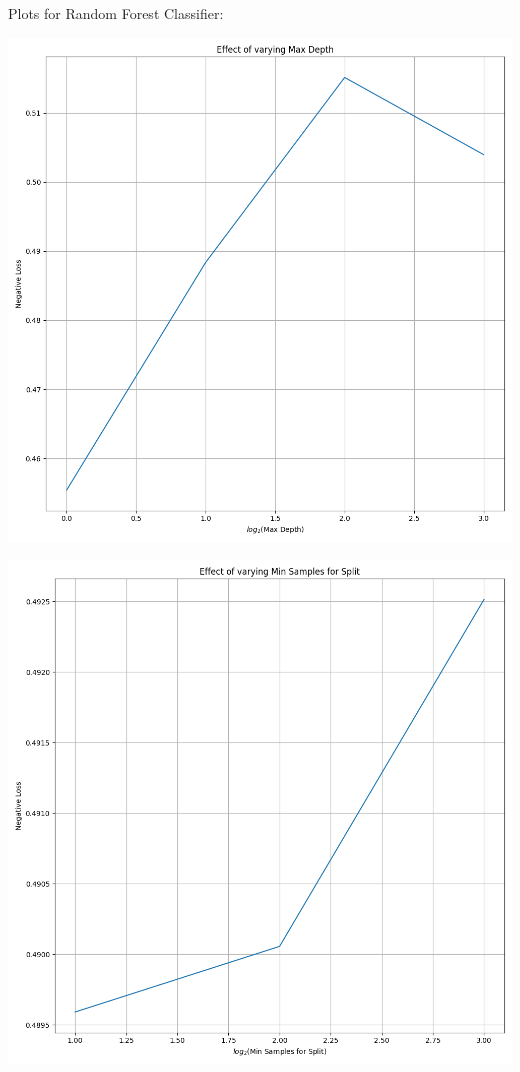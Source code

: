 \documentclass[12pt, letterpaper]{article}
\begin{document}
Plots for Random Forest Classifier:

\includegraphics[scale=\myscale]{random_forest_classifier_Max Depth.png}

\includegraphics[scale=\myscale]{random_forest_classifier_Min Samples for Split.png}
\end{document}
